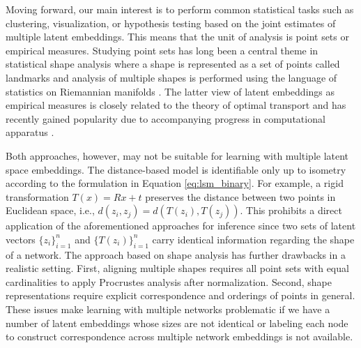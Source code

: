 \documentclass[12pt]{article}
\begin{document}

Moving forward, our main interest is to perform common statistical tasks such as clustering, visualization, or hypothesis testing based on the joint estimates of multiple latent embeddings. This means that the unit of analysis is point sets or empirical measures. Studying point sets has long been a central theme in statistical shape analysis \citep{dryden_statistical_1998} where a shape is represented as a set of points called landmarks and analysis of multiple shapes is performed using the language of statistics on Riemannian manifolds \citep{bhattacharya_nonparametric_2015}. The latter view of latent embeddings as empirical measures is closely related to the theory of optimal transport and has recently gained popularity due to accompanying progress in computational apparatus \citep{villani_optimal_2009}. 


Both approaches, however, may not be suitable for learning with multiple latent space embeddings. The distance-based model is identifiable only up to isometry according to the formulation in Equation \eqref{eq:lsm_binary}. For example, a rigid transformation $T(x) = Rx + t$ preserves the distance between two points in Euclidean space, i.e., $d(z_i, z_j) = d(T(z_i), T(z_j))$. This prohibits a direct application of the aforementioned approaches for inference since two sets of latent vectors $\lbrace z_i \rbrace_{i=1}^n$ and $\lbrace T(z_i) \rbrace_{i=1}^n$ carry identical information regarding the shape of a network. The approach based on shape analysis has further drawbacks in a realistic setting. First, aligning multiple shapes requires all point sets with equal cardinalities to apply Procrustes analysis after normalization. Second, shape representations require explicit correspondence and orderings of points in general. These issues make learning with multiple networks problematic if we have a number of latent embeddings whose sizes are not identical or labeling each node to construct correspondence across multiple network embeddings is not available. 
\end{document}

